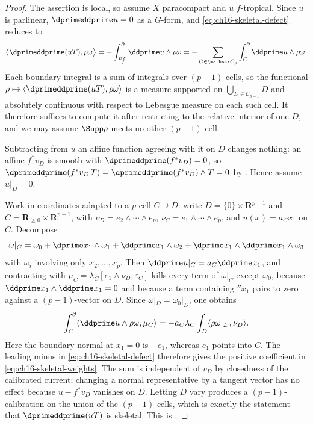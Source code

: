 \begin{proof}
The assertion is local, so assume $X$ paracompact and $u$ $f$-tropical.
Since $u$ is parlinear, $\dprimeddprime u=0$ as a $G$-form, and
\eqref{eq:ch16-skeletal-defect} reduces to
\[
 \bigl\langle\dprimeddprime(uT),\rho\omega\bigr\rangle
 =-\int^\partial_{P^T_f}\ddprime u\wedge\rho\omega
 =-\sum_{C\in\mathscr C_p}\int^\partial_C\ddprime u\wedge\rho\omega .
\]
Each boundary integral is a sum of integrals over $(p-1)$-cells, so the
functional $\rho\mapsto\langle\dprimeddprime(uT),\rho\omega\rangle$ is a
measure supported on $\bigcup_{D\in\mathscr C_{p-1}}D$ and absolutely
continuous with respect to Lebesgue measure on each such cell.  It therefore
suffices to compute it after restricting to the relative interior of one
$D$, and we may assume $\Supp\rho$ meets no other $(p-1)$-cell.

Subtracting from $u$ an affine function agreeing with it on $D$ changes
nothing: an affine $f^*v_D$ is smooth with $\dprimeddprime(f^*v_D)=0$, so
$\dprimeddprime(f^*v_D\,T)=\dprimeddprime(f^*v_D)\wedge T=0$ by
.  Hence assume $u|_D=0$.

Work in coordinates adapted to a $p$-cell $C\supseteq D$: write
$D=\{0\}\times\mathbf R^{p-1}$ and $C=\mathbf R_{\geq0}\times\mathbf
R^{p-1}$, with $\nu_D=e_2\wedge\cdots\wedge e_p$,
$\nu_C=e_1\wedge\cdots\wedge e_p$, and $u(x)=a_Cx_1$ on $C$.  Decompose
\[
 \omega|_C=\omega_0+\dprime x_1\wedge\omega_1
   +\ddprime x_1\wedge\omega_2
   +\dprime x_1\wedge\ddprime x_1\wedge\omega_3
\]
with $\omega_i$ involving only $x_2,\ldots,x_p$.  Then
$\ddprime u|_C=a_C\ddprime x_1$, and contracting with
$\mu_C=\lambda_C[e_1\wedge\nu_D,\varepsilon_C]$ kills every term of
$\omega|_C$ except $\omega_0$, because $\ddprime x_1\wedge\ddprime x_1=0$
and because a term containing $\dprime x_1$ pairs to zero against a
$(p-1)$-vector on $D$.  Since $\omega|_D=\omega_0|_D$, one obtains
\[
 \int^\partial_C\langle\ddprime u\wedge\rho\omega,\mu_C\rangle
 =-a_C\lambda_C\int_D\langle\rho\omega|_D,\nu_D\rangle .
\]
Here the boundary normal at $x_1=0$ is $-e_1$, whereas $e_1$ points
into $C$.  The leading minus in \eqref{eq:ch16-skeletal-defect} therefore
gives the positive coefficient in \eqref{eq:ch16-skeletal-weights}.
The sum is independent of $v_D$ by closedness of the calibrated current;
changing a normal representative by a tangent vector has no effect because
$u-f^*v_D$ vanishes on $D$.  Letting $D$ vary produces a
$(p-1)$-calibration on the union of the $(p-1)$-cells, which is exactly the
statement that $\dprimeddprime(uT)$ is skeletal.  This is
\cite[Theorem~8.10.3]{CLD25}.
\end{proof}

